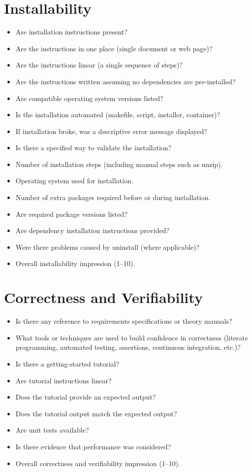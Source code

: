 \section*{Installability}

\begin{itemize}
    \item Are installation instructions present?
    \item Are the instructions in one place (single document or web page)?
    \item Are the instructions linear (a single sequence of steps)?
    \item Are the instructions written assuming no dependencies are pre-installed?
    \item Are compatible operating system versions listed?
    \item Is the installation automated (makefile, script, installer, container)?
    \item If installation broke, was a descriptive error message displayed?
    \item Is there a specified way to validate the installation?
    \item Number of installation steps (including manual steps such as unzip).
    \item Operating system used for installation.
    \item Number of extra packages required before or during installation.
    \item Are required package versions listed?
    \item Are dependency installation instructions provided?
    \item Were there problems caused by uninstall (where applicable)?
    \item Overall installability impression (1--10).
\end{itemize}

\section*{Correctness and Verifiability}

\begin{itemize}
    \item Is there any reference to requirements specifications or theory manuals?
    \item What tools or techniques are used to build confidence in correctness (literate programming, automated testing, assertions, continuous integration, etc.)?
    \item Is there a getting-started tutorial?
    \item Are tutorial instructions linear?
    \item Does the tutorial provide an expected output?
    \item Does the tutorial output match the expected output?
    \item Are unit tests available?
    \item Is there evidence that performance was considered?
    \item Overall correctness and verifiability impression (1--10).
\end{itemize}

